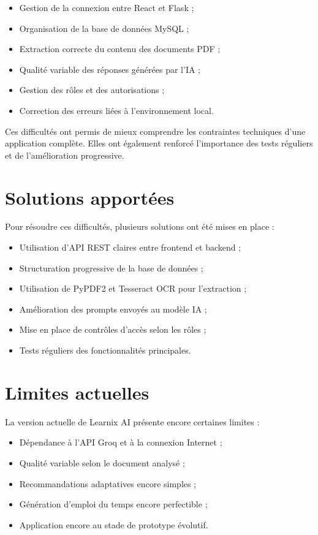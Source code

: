 \documentclass[12pt,a4paper]{report}
\begin{document}
\begin{itemize}
    \item Gestion de la connexion entre React et Flask ;
    \item Organisation de la base de données MySQL ;
    \item Extraction correcte du contenu des documents PDF ;
    \item Qualité variable des réponses générées par l'IA ;
    \item Gestion des rôles et des autorisations ;
    \item Correction des erreurs liées à l'environnement local.
\end{itemize}

Ces difficultés ont permis de mieux comprendre les contraintes techniques d'une
application complète. Elles ont également renforcé l'importance des tests
réguliers et de l'amélioration progressive.

\section{Solutions apportées}

Pour résoudre ces difficultés, plusieurs solutions ont été mises en place :

\begin{itemize}
    \item Utilisation d'API REST claires entre frontend et backend ;
    \item Structuration progressive de la base de données ;
    \item Utilisation de PyPDF2 et Tesseract OCR pour l'extraction ;
    \item Amélioration des prompts envoyés au modèle IA ;
    \item Mise en place de contrôles d'accès selon les rôles ;
    \item Tests réguliers des fonctionnalités principales.
\end{itemize}

\section{Limites actuelles}

La version actuelle de Learnix AI présente encore certaines limites :

\begin{itemize}
    \item Dépendance à l'API Groq et à la connexion Internet ;
    \item Qualité variable selon le document analysé ;
    \item Recommandations adaptatives encore simples ;
    \item Génération d'emploi du temps encore perfectible ;
    \item Application encore au stade de prototype évolutif.
\end{itemize}
\end{document}
